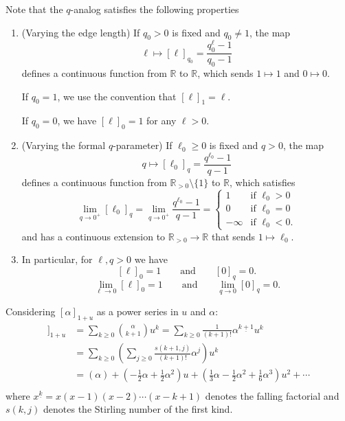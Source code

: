 \documentclass{amsart}
\theoremstyle{definition}
\newcommand{\RR}{\mathbb{R}}
\newcommand{\RRpos}{\RR_{>0}}
\newcommand{\fanalog}[2]{[\![#2]\!]_{#1}}
\begin{document}
Note that the $q$-analog satisfies the following properties
\begin{enumerate}
\item (Varying the edge length) If $q_0>0$ is fixed and $q_0 \neq 1$, the map 
$$\ell \mapsto [\ell]_{q_0} = \frac{q_0^\ell - 1}{q_0 - 1}$$
defines a continuous function from $\RR$ to $\RR$,
which sends $1 \mapsto 1$ and $0 \mapsto 0$.

If $q_0 = 1$,
we use the convention that $[\ell]_1 = \ell$.

If $q_0 = 0$,
we have $[\ell]_0 = 1$ for any $\ell > 0$.

\item (Varying the formal $q$-parameter) If $\ell_0\geq 0$ is fixed and $q > 0$,
the map 
\[
q \mapsto [\ell_0]_q = \frac{q^{\ell_0} - 1}{q - 1}
\]
defines a continuous function from $\RRpos \setminus\{1\}$ to $\RR$,
which satisfies
\[ 
	\lim_{q \to 0^+} [\ell_0]_q  = 
	\lim_{q \to 0^+} \frac{q^{\ell_0} - 1}{q - 1} =
	\begin{cases}
	1 &\text{if } \ell_0 > 0 \\
	0 &\text{if } \ell_0 = 0 \\
	-\infty &\text{if } \ell_0 <0.
	\end{cases}
\]
and has a continuous extension to $\RRpos \to \RR$ that sends $1 \mapsto \ell_0$.

\item 
In particular, for $\ell, q > 0$ we have
\[
	[\ell]_0 = 1 
	\qquad\text{and}\qquad
	[0]_q = 0.
\]
\[
	\lim_{\ell \to 0} [\ell]_0 = 1 
	\qquad\text{and}\qquad
	\lim_{q \to 0} [0]_q = 0.
\]
\end{enumerate}

Considering $[\alpha]_{1+u}$ as a power series in $u$ and $\alpha$:
\begin{align*}
\fanalog{1 + u}{\alpha} &= \sum_{k \geq 0} \binom{\alpha}{k+1}u^k  
= \sum_{k \geq 0} \frac1{(k+1)!} \alpha^{\underline{k+1}} u^k \\
&= \sum_{k \geq 0} \left( \sum_{j \geq 0} \frac{s(k+1,j)}{(k+1)!} \alpha^j \right) u^k \\
&= (\alpha) + (-\frac12\alpha + \frac12 \alpha^2)u + (\frac13\alpha - \frac12 \alpha^2 + \frac16 \alpha^3)u^2 + \cdots \\
\end{align*}
where $x^{\underline{k}} = x(x-1)(x-2)\cdots(x-k+1)$ denotes the falling factorial and $s(k,j)$ denotes the Stirling number of the first kind.
\end{document}
